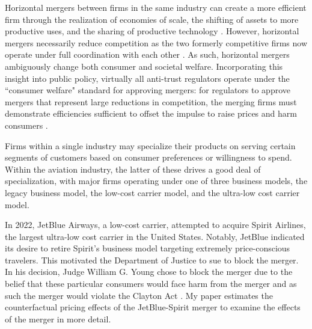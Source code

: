 \documentclass{article}
\begin{document}
    
    Horizontal mergers between firms in the same industry can create a more efficient firm through the realization of economies of scale, the shifting of assets to more productive uses, and the sharing of productive technology \citep{williamson_economies_1968, farrell_horizontal_1990, kaplow_improving_2025}. However, horizontal mergers necessarily reduce competition as the two formerly competitive firms now operate under full coordination with each other \citep{stigler_theory_1964}. As such, horizontal mergers ambiguously change both consumer and societal welfare. Incorporating this insight into public policy, virtually all anti-trust regulators operate under the  ``consumer welfare" standard for approving mergers: for regulators to approve mergers that represent large reductions in competition, the merging firms must demonstrate efficiencies sufficient to offset the impulse to raise prices and harm consumers \citep{whinston_chapter_2007}. %

	Firms within a single industry may specialize their products on serving certain segments of customers based on consumer preferences or willingness to spend. Within the aviation industry, the latter of these drives a good deal of specialization, with major firms operating under one of three business models, the legacy business model, the low-cost carrier model, and the ultra-low cost carrier model. 

    In 2022, JetBlue Airways, a low-cost carrier, attempted to acquire Spirit Airlines, the largest ultra-low cost carrier in the United States. Notably, JetBlue indicated its desire to retire Spirit's business model targeting extremely price-conscious travelers.   This motivated the Department of Justice to sue to block the merger. In his decision, Judge William G. Young chose to block the merger due to the belief that these particular consumers would face harm from the merger and as such the merger would violate the Clayton Act \citep{william_g_young_findings_2024}.  My paper estimates the counterfactual pricing effects of the JetBlue-Spirit merger to examine the effects of the merger in more detail. 
    
\end{document}
